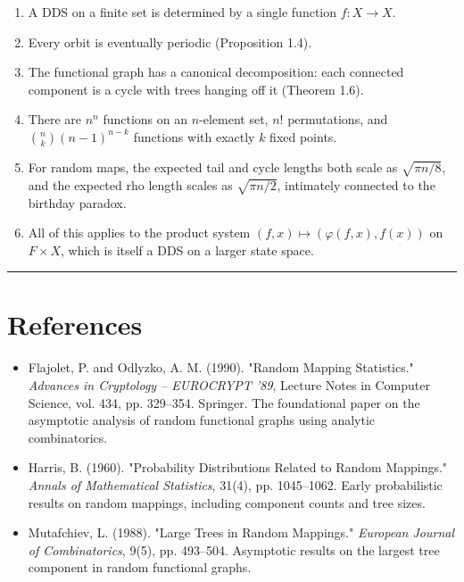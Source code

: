 \begin{enumerate}
  \item A DDS on a finite set is determined by a single function $f: X \to X$.
  \item Every orbit is eventually periodic (Proposition 1.4).
  \item The functional graph has a canonical decomposition: each connected component is a cycle with trees hanging off it (Theorem 1.6).
  \item There are $n^n$ functions on an $n$-element set, $n!$ permutations, and $\binom{n}{k}(n-1)^{n-k}$ functions with exactly $k$ fixed points.
  \item For random maps, the expected tail and cycle lengths both scale as $\sqrt{\pi n/8}$, and the expected rho length scales as $\sqrt{\pi n/2}$, intimately connected to the birthday paradox.
  \item All of this applies to the product system $(f, x) \mapsto (\varphi(f,x), f(x))$ on $F \times X$, which is itself a DDS on a larger state space.
\end{enumerate}

\bigskip\hrule\bigskip

\section{References}

\begin{itemize}
  \item Flajolet, P. and Odlyzko, A. M. (1990). "Random Mapping Statistics." \textit{Advances in Cryptology -- EUROCRYPT '89}, Lecture Notes in Computer Science, vol. 434, pp. 329--354. Springer. The foundational paper on the asymptotic analysis of random functional graphs using analytic combinatorics.
\end{itemize}

\begin{itemize}
  \item Harris, B. (1960). "Probability Distributions Related to Random Mappings." \textit{Annals of Mathematical Statistics}, 31(4), pp. 1045--1062. Early probabilistic results on random mappings, including component counts and tree sizes.
\end{itemize}

\begin{itemize}
  \item Mutafchiev, L. (1988). "Large Trees in Random Mappings." \textit{European Journal of Combinatorics}, 9(5), pp. 493--504. Asymptotic results on the largest tree component in random functional graphs.
\end{itemize}

